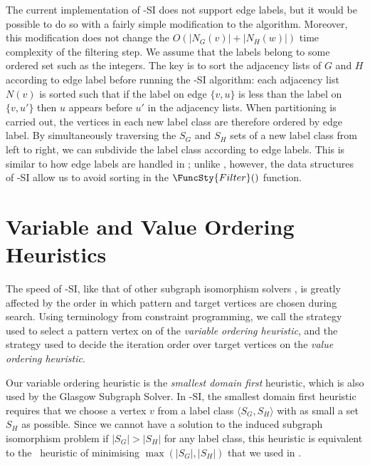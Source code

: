 The current implementation of \McSplit-SI does not support edge labels, but it
would be possible to do so with a fairly simple modification to the algorithm.
Moreover, this modification does not change the
$O(|N_G(v)| + |N_H(w)|)$ time complexity of the filtering step.  We assume that
the labels belong to some ordered set such as the integers.  The key is to sort
the adjacency lists of $G$ and $H$ according to edge label before running the \McSplit-SI
algorithm: each adjacency list $N(v)$ is sorted such that if the label on edge
$\{v,u\}$ is less than the label on $\{v,u'\}$ then $u$ appears before $u'$ in
the adjacency lists.  When partitioning is carried out, the
vertices in each new label class are therefore ordered by edge label.
By simultaneously
traversing the $S_G$ and $S_H$ sets of a new label class from left to right, we
can subdivide the label class according to edge labels.  This is similar to how
edge labels are handled in \McSplit; unlike \McSplit, however, the
data structures of \McSplit-SI allow us to avoid sorting in the $\FuncSty{Filter}()$
function.

\section{Variable and Value Ordering Heuristics}\label{sec:mcsplit-si-heuristics}

The speed of \McSplit-SI, like that of other subgraph isomorphism solvers
\citep{DBLP:journals/tcbb/BonniciG17,DBLP:journals/jair/McCreeshPST18},
is greatly affected by the order
in which pattern and target vertices are chosen during search.
Using terminology from constraint programming, we call the strategy
used to select a pattern vertex on  of
 the \emph{variable ordering heuristic}, and the
strategy used to decide the iteration order over target vertices on
 the \emph{value ordering heuristic}.

Our variable ordering heuristic is the \emph{smallest domain first} heuristic,
which is also used by the Glasgow Subgraph Solver.
In \McSplit-SI, the smallest domain first heuristic requires
that we choose a vertex $v$ from a label class $\langle S_G, S_H \rangle$ with
as small a set $S_H$ as possible.  Since we cannot have a solution
to the induced subgraph isomorphism problem
if $|S_G|>|S_H|$ for any label class, this heuristic is equivalent
to the \McSplit\ heuristic of minimising $\max(|S_G|,|S_H|)$ that we
used in .

